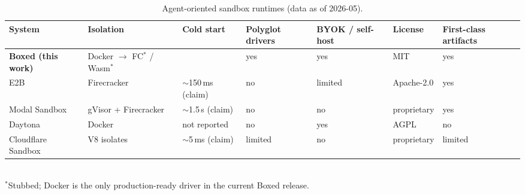 \begin{table}[t]
\centering
\small
\caption{Agent-oriented sandbox runtimes (data as of 2026-05).}
\label{tab:compare}
\begin{tabular}{lllllll}
\toprule
System & Isolation & Cold start & Polyglot drivers & BYOK / self-host & License & First-class artifacts \\
\midrule
\textbf{Boxed (this work)} & Docker $\rightarrow$ FC$^{*}$ / Wasm$^{*}$ & \BoxedColdMedian{} & yes & yes & MIT & yes \\
E2B~\cite{e2b}             & Firecracker            & $\sim$150\,ms (claim) & no  & limited & Apache-2.0 & yes \\
Modal Sandbox~\cite{modal} & gVisor + Firecracker   & $\sim$1.5\,s (claim)  & no  & no      & proprietary & yes \\
Daytona~\cite{daytona}     & Docker                 & not reported          & no  & yes     & AGPL & no \\
Cloudflare Sandbox~\cite{cfsandbox} & V8 isolates    & $\sim$5\,ms (claim)   & limited & no & proprietary & limited \\
\bottomrule
\end{tabular}
\\[2pt]
{\footnotesize $^{*}$Stubbed; Docker is the only production-ready driver in the current Boxed release.}
\end{table}
